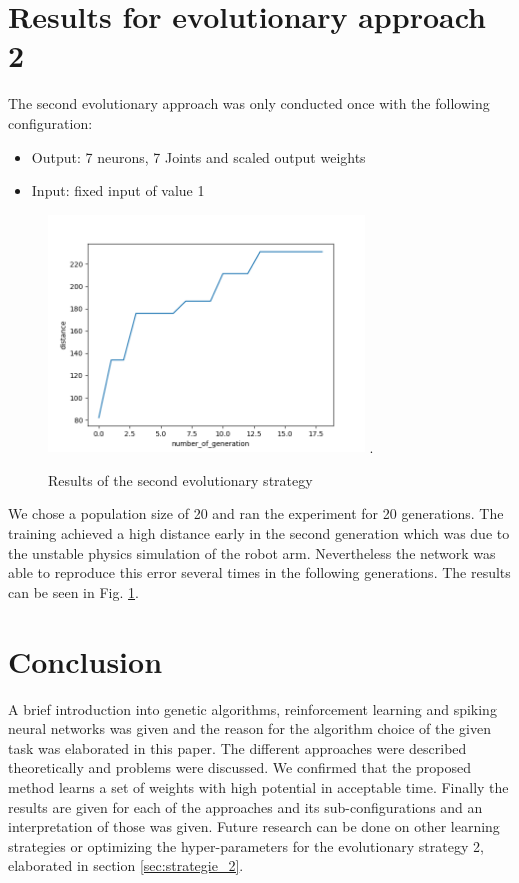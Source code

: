 \section{Results for evolutionary approach 2}
The second evolutionary approach was only conducted once with the following configuration:
\begin{itemize}
	\item Output: 7 neurons, 7 Joints and scaled output weights 
	\item Input: fixed input of value 1
\end{itemize}
\begin{figure}[H]
	\centering
	\includegraphics[width=3.3in]{img/approach2.png}
	\DeclareGraphicsExtensions.
	\caption{Results of the second evolutionary strategy}
	\label{fig:results_2}
\end{figure}
We chose a population size of 20 and ran the experiment for 20 generations. The training achieved a high distance early in the second generation which was due to the unstable physics simulation of the robot arm. Nevertheless the network was able to reproduce this error several times in the following generations. The results can be seen in Fig. \ref{fig:results_2}.

\section{Conclusion}
A brief introduction into genetic algorithms, reinforcement learning and spiking neural networks was given and the reason for the algorithm choice of the given task was elaborated in this paper. The different approaches were described theoretically and problems were discussed. We confirmed that the proposed method learns a set of weights with high potential in acceptable time. Finally the results are given for each of the approaches and its sub-configurations and an interpretation of those was given.
Future research can be done on other learning strategies or optimizing the hyper-parameters for the evolutionary strategy 2, elaborated in section \ref{sec:strategie_2}.